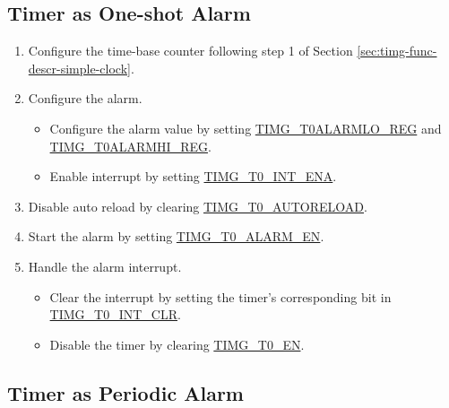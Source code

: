 \documentclass[main\_\_EN.tex]{subfiles}
\begin{document}
\subsection{Timer as One-shot Alarm}\label{sec:timg-func-descr-timer-alarm}
\begin{enumerate}
    \item Configure the time-base counter following step 1 of Section \ref{sec:timg-func-descr-simple-clock}.
    \item Configure the alarm.
    \begin{itemize}
        \item Configure the alarm value by setting \hyperref[regdesc:TIMGTXALARMLOREG]{TIMG\_T0ALARMLO\_REG} and \hyperref[regdesc:TIMGTXALARMHIREG]{TIMG\_T0ALARMHI\_REG}.
        \item Enable interrupt by setting  \hyperref[fielddesc:TIMGT0INTENA]{TIMG\_T0\_INT\_ENA}.
    \end{itemize}
    \item Disable auto reload by clearing \hyperref[fielddesc:TIMGTXAUTORELOAD]{TIMG\_T0\_AUTORELOAD}.
    \item Start the alarm by setting \hyperref[fielddesc:TIMGTXALARMEN]{TIMG\_T0\_ALARM\_EN}.
    \item Handle the alarm interrupt.
    \begin{itemize}
        \item Clear the interrupt by setting the timer's corresponding bit in \hyperref[fielddesc:TIMGT0INTCLR]{TIMG\_T0\_INT\_CLR}.
        \item Disable the timer by clearing \hyperref[fielddesc:TIMGTXEN]{TIMG\_T0\_EN}.
    \end{itemize}
\end{enumerate}

\subsection{Timer as Periodic Alarm}
\end{document}
